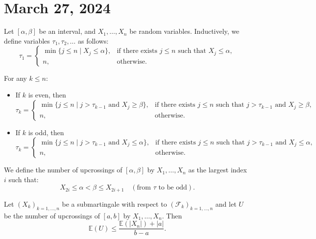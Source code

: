\section{March 27, 2024}

Let $[ \alpha, \beta ]$ be an interval, and $X_1, \ldots, X_n$ be random variables.
Inductively, we define variables $\tau_1, \tau_2, \ldots$ as follows:
\[
\tau_1 = 
\begin{cases} 
\min \{ j \leqslant n \mid X_j \leqslant \alpha \}, & \text{if there exists } j \leqslant n \text{ such that } X_j \leqslant \alpha, \\
n, & \text{otherwise}.
\end{cases}
\]

For any $k \leqslant n$:
\begin{itemize}
  \item If $k$ is even, then
  \[
  \tau_k = 
  \begin{cases} 
  \min \{ j \leqslant n \mid j > \tau_{k-1} \text{ and } X_j \geqslant \beta \}, & \text{if there exists } j \leqslant n \text{ such that } j > \tau_{k-1} \text{ and } X_j \geqslant \beta, \\
  n, & \text{otherwise}.
  \end{cases}
  \]
  
  \item If $k$ is odd, then
  \[
  \tau_k = 
  \begin{cases} 
  \min \{ j \leqslant n \mid j > \tau_{k-1} \text{ and } X_j \leqslant \alpha \}, & \text{if there exists } j \leqslant n \text{ such that } j > \tau_{k-1} \text{ and } X_j \leqslant \alpha, \\
  n, & \text{otherwise}.
  \end{cases}
  \]
\end{itemize}

We define the number of upcrossings of $[\alpha,\beta]$ by $X_1, \ldots, X_n$ as the largest index $i$ such that:
\[
X_{2i} \leqslant \alpha < \beta \leqslant X_{2i+1} \quad (\text{from } \tau \text{ to be odd}).
\]

\begin{theorem}
Let $(X_k)_{k=1,\ldots,n}$ be a submartingale with respect to $(\mathcal{F}_k)_{k=1,\ldots,n}$ and let $U$ be the number of upcrossings of $[a,b]$ by $X_1,\ldots,X_n$. Then
\[ \mathbb{E}(U) \leq \frac{\mathbb{E}(|X_n|) + |a|}{b-a}. \]
\end{theorem}

